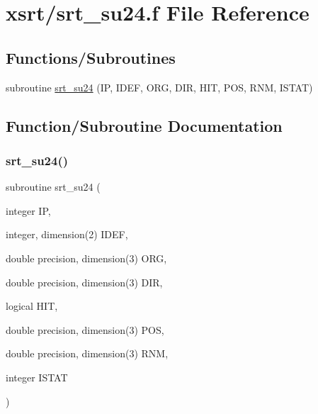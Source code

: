 \hypertarget{srt__su24_8f}{}\section{xsrt/srt\+\_\+su24.f File Reference}
\label{srt__su24_8f}
\subsection*{Functions/\+Subroutines}
\begin{DoxyCompactItemize}
\item 
subroutine \hyperlink{srt__su24_8f_a7bd1800515002a84439a71032a3114ef}{srt\+\_\+su24} (IP, I\+D\+EF, O\+RG, D\+IR, H\+IT, P\+OS, R\+NM, I\+S\+T\+AT)
\end{DoxyCompactItemize}


\subsection{Function/\+Subroutine Documentation}
\mbox{\label{srt__su24_8f_a7bd1800515002a84439a71032a3114ef}} 
\subsubsection{\texorpdfstring{srt\+\_\+su24()}{srt\_su24()}}
{\footnotesize\ttfamily subroutine srt\+\_\+su24 (\begin{DoxyParamCaption}\item[{integer}]{IP,  }\item[{integer, dimension(2)}]{I\+D\+EF,  }\item[{double precision, dimension(3)}]{O\+RG,  }\item[{double precision, dimension(3)}]{D\+IR,  }\item[{logical}]{H\+IT,  }\item[{double precision, dimension(3)}]{P\+OS,  }\item[{double precision, dimension(3)}]{R\+NM,  }\item[{integer}]{I\+S\+T\+AT }\end{DoxyParamCaption})}

